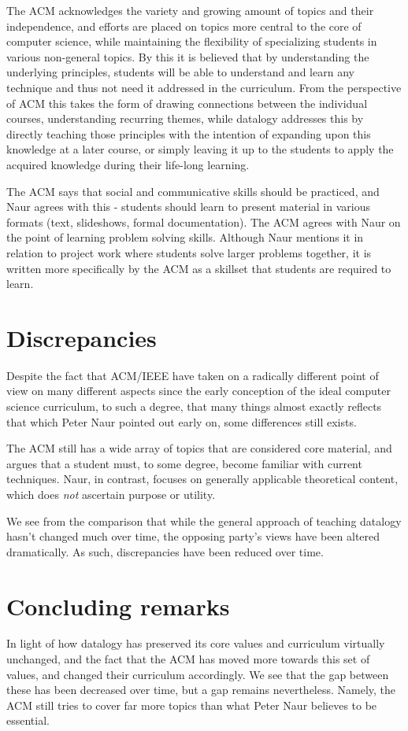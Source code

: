 \documentclass[11pt,a4paper]{article}
\begin{document}
The ACM acknowledges the variety and growing amount of topics and their independence, and efforts are placed on topics
more central to the core of computer science, while maintaining the flexibility of specializing students in various
non-general topics. By this it is believed that by understanding the underlying principles, students will be able to
understand and learn any technique and thus not need it addressed in the curriculum. From the perspective of ACM this
takes the form of drawing connections between the individual courses, understanding recurring themes, while datalogy
addresses this by directly teaching those principles with the intention of expanding upon this knowledge at a later
course, or simply leaving it up to the students to apply the acquired knowledge during their life-long learning.

The ACM says that social and communicative skills should be practiced, and Naur agrees with this - students should learn
to present material in various formats (text, slideshows, formal documentation).
The ACM agrees with Naur on the point of learning problem solving skills. Although Naur mentions it in relation to
project work where students solve larger problems together, it is written more specifically by the ACM as a skillset
that students are required to learn.

\section{Discrepancies}
Despite the fact that ACM/IEEE have taken on a radically different point of view on many different aspects since the
early conception of the ideal computer science curriculum, to such a degree, that many things almost exactly reflects
that which Peter Naur pointed out early on, some differences still exists.

The ACM still has a wide array of topics that are considered core material, and argues that a student must, to some
degree, become familiar with current techniques. Naur, in contrast, focuses on generally applicable theoretical content,
which does \emph{not} ascertain purpose or utility.

We see from the comparison that while the general approach of teaching datalogy hasn’t changed much over time, the
opposing party’s views have been altered dramatically. As such, discrepancies have been reduced over time.

\section{Concluding remarks}
In light of how datalogy has preserved its core values and curriculum virtually unchanged, and the fact that the ACM has
moved more towards this set of values, and changed their curriculum accordingly. We see that the gap between these has
been decreased over time, but a gap remains nevertheless. Namely, the ACM still tries to cover far more topics than what
Peter Naur believes to be essential.
\end{document}

